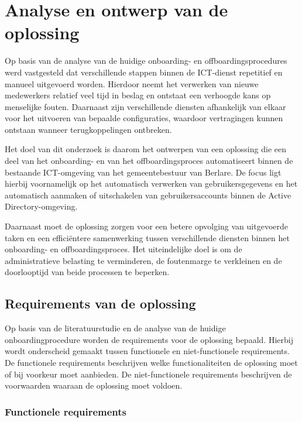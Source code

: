 
\chapter{Analyse en ontwerp van de oplossing}
\label{ch:analyseontwerp}

Op basis van de analyse van de huidige onboarding- en offboardingsprocedures werd vastgesteld dat verschillende stappen binnen de ICT-dienst repetitief en manueel uitgevoerd worden. Hierdoor neemt het verwerken van nieuwe medewerkers relatief veel tijd in beslag en ontstaat een verhoogde kans op menselijke fouten. Daarnaast zijn verschillende diensten afhankelijk van elkaar voor het uitvoeren van bepaalde configuraties, waardoor vertragingen kunnen ontstaan wanneer terugkoppelingen ontbreken.

Het doel van dit onderzoek is daarom het ontwerpen van een oplossing die een deel van het onboarding- en van het offboardingsproces automatiseert binnen de bestaande ICT-omgeving van het gemeentebestuur van Berlare. De focus ligt hierbij voornamelijk op het automatisch verwerken van gebruikersgegevens en het automatisch aanmaken of uitschakelen van gebruikersaccounts binnen de Active Directory-omgeving.

Daarnaast moet de oplossing zorgen voor een betere opvolging van uitgevoerde taken en een efficiëntere samenwerking tussen verschillende diensten binnen het onboarding- en offboardingsproces. Het uiteindelijke doel is om de administratieve belasting te verminderen, de foutenmarge te verkleinen en de doorlooptijd van beide processen te beperken.

\section{Requirements van de oplossing}

Op basis van de literatuurstudie en de analyse van de huidige onboardingprocedure worden de requirements voor de oplossing bepaald. Hierbij wordt onderscheid gemaakt tussen functionele en niet-functionele requirements. De functionele requirements beschrijven welke functionaliteiten de oplossing moet of bij voorkeur moet aanbieden. De niet-functionele requirements beschrijven de voorwaarden waaraan de oplossing moet voldoen.

\subsection{Functionele requirements}

